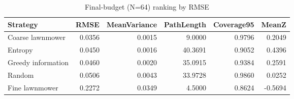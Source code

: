 \begin{table}
\caption{Final-budget (N=64) ranking by RMSE}
\label{tab:final_ranking}
\begin{tabular}{lrrrrr}
\toprule
Strategy & RMSE & MeanVariance & PathLength & Coverage95 & MeanZ \\
\midrule
Coarse lawnmower & 0.0356 & 0.0015 & 9.0000 & 0.9796 & 0.2049 \\
Entropy & 0.0450 & 0.0016 & 40.3691 & 0.9052 & 0.4396 \\
Greedy information & 0.0460 & 0.0020 & 35.0915 & 0.9384 & 0.2591 \\
Random & 0.0506 & 0.0043 & 33.9728 & 0.9860 & 0.0252 \\
Fine lawnmower & 0.2272 & 0.0349 & 4.5000 & 0.8624 & -0.5694 \\
\bottomrule
\end{tabular}
\end{table}
